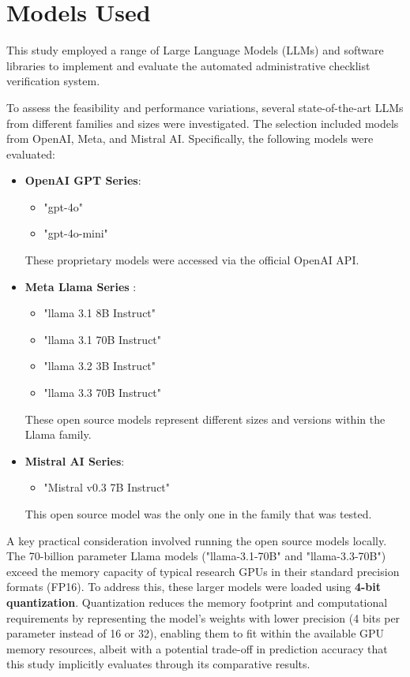 \documentclass[../main.tex]{subfiles}
\begin{document}
\section{Models Used}
\label{subsec:models}
This study employed a range of Large Language Models (LLMs) and software libraries to implement and evaluate the automated administrative checklist verification system.

To assess the feasibility and performance variations, several state-of-the-art LLMs from different families and sizes were investigated. The selection included models from OpenAI, Meta, and Mistral AI. Specifically, the following models were evaluated:

\begin{itemize}
    \item \textbf{OpenAI GPT Series}: 
        \begin{itemize}
            \item "gpt-4o"
            \item "gpt-4o-mini" 
        \end{itemize}
        These proprietary models were accessed via the official OpenAI API.
        
    \item \textbf{Meta Llama Series} :
        \begin{itemize}
            \item "llama 3.1 8B Instruct"
            \item "llama 3.1 70B Instruct"
            \item "llama 3.2 3B Instruct"
            \item "llama 3.3 70B Instruct"
        \end{itemize}
        These open source models represent different sizes and versions within the Llama family.
        
    \item \textbf{Mistral AI Series}:
        \begin{itemize}
            \item "Mistral v0.3 7B Instruct"
        \end{itemize}
        This open source model was the only one in the family that was tested.
\end{itemize}

A key practical consideration involved running the open source models locally. The 70-billion parameter Llama models ("llama-3.1-70B" and "llama-3.3-70B") exceed the memory capacity of typical research GPUs in their standard precision formats (FP16). To address this, these larger models were loaded using \textbf{4-bit quantization}. Quantization reduces the memory footprint and computational requirements by representing the model's weights with lower precision (4 bits per parameter instead of 16 or 32), enabling them to fit within the available GPU memory resources, albeit with a potential trade-off in prediction accuracy that this study implicitly evaluates through its comparative results\cite{gholami2021surveyquantizationmethodsefficient,li2024evaluating}.
\end{document}
